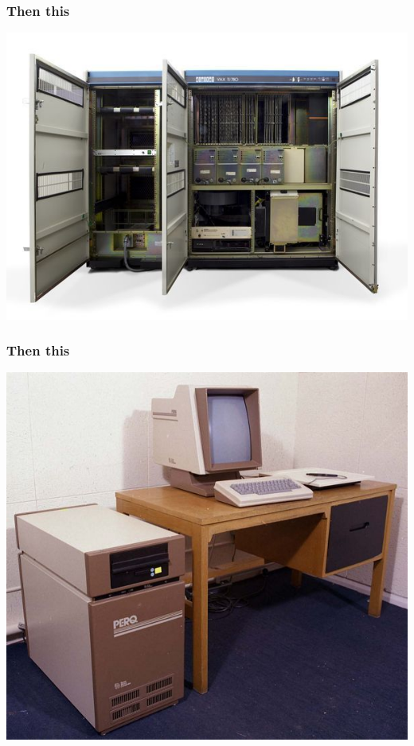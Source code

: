 \documentclass{beamer}
\begin{document}
\begin{frame}
  \frametitle{Then this}
  \begin{center}
    \includegraphics[width=\textwidth]{img/vax.jpg}
  \end{center}
\end{frame}

\begin{frame}
  \frametitle{Then this}
  \begin{center}
    \includegraphics[width=\textwidth]{img/early-workstation.jpg}
  \end{center}
\end{frame}
\end{document}
